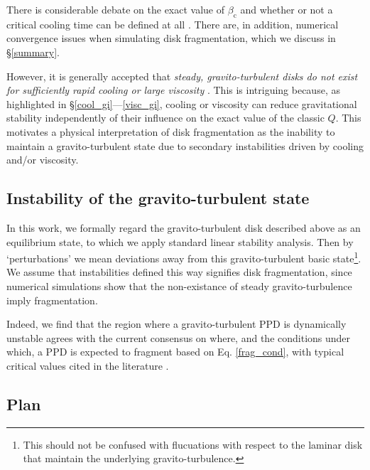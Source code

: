 \documentclass[iop, numberedappendix]{emulateapj}
\begin{document}
There is considerable debate on the exact value of $\beta_\mathrm{c}$  
and whether or not a critical cooling time can be defined at all
\citep{meru11,lodato11,meru12,paardekooper12,hopkins13}. There are, in
addition, numerical convergence issues when simulating disk  
fragmentation, which we discuss in \S\ref{summary}. 

However, it is generally accepted that \emph{steady, gravito-turbulent
  disks do not  
  exist for sufficiently rapid cooling or large viscosity} \citep{johnson03}.   
This is intriguing because, as highlighted in
\S\ref{cool_gi}---\ref{visc_gi}, cooling or viscosity can reduce 
gravitational stability independently of their influence on the exact
value of the classic $Q$. This 
motivates a physical      
interpretation of disk fragmentation as the inability to maintain a
gravito-turbulent state due to 
secondary instabilities driven by cooling and/or viscosity.

{\bf 
\subsection{Instability of the gravito-turbulent state}\label{gi_of_gi}
  In this work, we formally regard the gravito-turbulent
  disk described above as an equilibrium state, to which we apply    
  standard linear stability analysis. Then by `perturbations' we mean   
  deviations away from this gravito-turbulent 
  basic state\footnote{This should not be confused with 
    flucuations with respect to the 
    laminar disk that maintain the underlying
    gravito-turbulence.}. 
  We assume that instabilities defined this way  
  signifies disk fragmentation, since numerical simulations  
  show that the non-existance of steady gravito-turbulence imply    
  fragmentation.   
}

Indeed, we find that the region where a gravito-turbulent PPD is
dynamically unstable agrees with the current consensus on  where, and
the conditions under which, a PPD is expected to fragment based on
Eq. \ref{frag_cond}, with typical critical values cited in the
literature \citep[e.g. $\beta_c\sim
  3,\,\alpha_c\sim0.1$,][]{gammie01,rice05}.    
   
\subsection{Plan}\label{plan}
\end{document}
